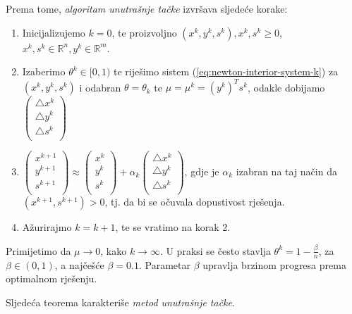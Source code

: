 \documentclass[b5paper, utf8, 11pt, colorlinks]{book}
\theoremstyle{definition}
\begin{document}
Prema tome, \emph{algoritam unutrašnje tačke} izvršava sljedeće korake:
\begin{enumerate}
	\item Inicijalizujemo $k=0$, te proizvoljno  $(x^k, y^k, s^k), x^k, s^k \geq 0$, $x^k,s^k \in \mathbb{R}^n, y^k \in \mathbb{R}^m$.
	\item Izaberimo $ \theta^k \in [0, 1)$ te riješimo sistem (\ref{eq:newton-interior-system-k}) za $(x^k,y^k,s^k)$ i odabran $\theta = \theta_k$ te $\mu = \mu^k = (y^k)^T s^k $,  odakle   dobijamo
	$  
	\begin{pmatrix}
		\bigtriangleup x^k      \\
		\bigtriangleup y^k       \\
		\bigtriangleup s^k       \\
	\end{pmatrix}    
	$
	
	\item $ 
	\begin{pmatrix}
		x^{k+1}  \\
		y^{k+1}   \\
		s^{k+1}   \\
	\end{pmatrix} \approx
	\begin{pmatrix}
		x^k  \\
		y^k  \\
		s^k  \\
	\end{pmatrix} +   
	\alpha_k 
	\begin{pmatrix}
		\bigtriangleup x^k       \\
		\bigtriangleup y^k       \\
		\bigtriangleup s^k       \\
	\end{pmatrix}  
	$, gdje je $\alpha_k$ izabran na taj način da $(x^{k+1}, s^{k+1}) > 0$, tj. da bi se očuvala dopustivost rješenja. 
	\item Ažurirajmo $k = k + 1$, te se vratimo na korak 2.
\end{enumerate}
Primijetimo da $\mu \rightarrow 0$, kako $k \rightarrow \infty$. U praksi se često stavlja $\theta^k = 1 - \frac{\beta}{n}$, za $\beta \in (0,1)$, a najčešće $\beta= 0.1$.  Parametar $\beta$ upravlja brzinom progresa prema optimalnom rješenju.  


Sljedeća teorema   karakteriše \emph{metod unutrašnje tačke}.
\end{document}
